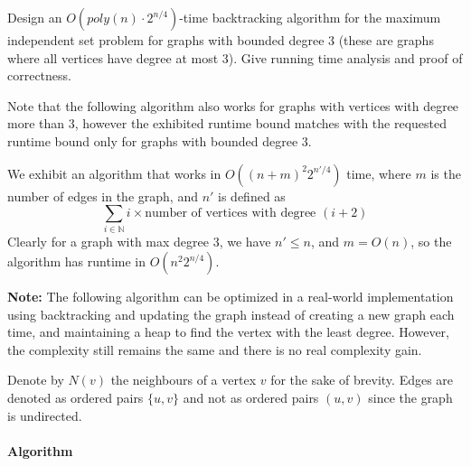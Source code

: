 \documentclass[answers]{exam}
\begin{document}
\begin{questions}

\question[20] Design an $O(poly(n) \cdot 2^{n/4})$-time backtracking algorithm for the maximum independent set problem for graphs with bounded degree $3$ (these are graphs where all vertices have degree at most $3$). Give running time analysis and proof of correctness.

\begin{solution}

    Note that the following algorithm also works for graphs with vertices with degree more than $3$, however the exhibited runtime bound matches with the requested runtime bound only for graphs with bounded degree $3$.

    We exhibit an algorithm that works in $O((n + m)^2 2^{n'/4})$ time, where $m$ is the number of edges in the graph, and $n'$ is defined as $$\sum_{i \in \mathbb{N}} i \times\text{number of vertices with degree }(i + 2)$$
    Clearly for a graph with max degree $3$, we have $n' \le n$, and $m = O(n)$, so the algorithm has runtime in $O(n^2 2^{n/4})$. 

    \textbf{Note:} The following algorithm can be optimized in a real-world implementation using backtracking and updating the graph instead of creating a new graph each time, and maintaining a heap
    to find the vertex with the least degree. However, the complexity still remains the same and there is no real complexity gain.

    Denote by $N(v)$ the neighbours of a vertex $v$ for the sake of brevity. Edges are denoted as ordered pairs $\{u, v\}$ and not as ordered pairs $(u, v)$ since the graph is undirected.

\paragraph{Algorithm}


\end{solution}
\end{questions}
\end{document}
